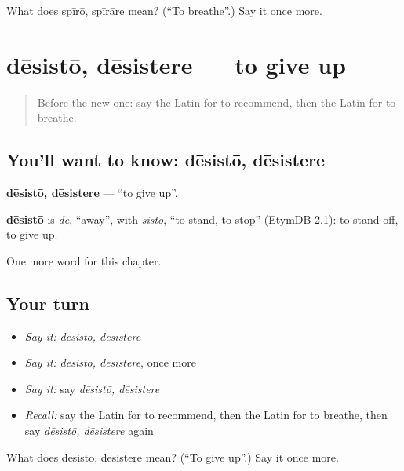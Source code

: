 \begin{tcolorbox}[breakable,colback=teal!4,colframe=teal!35!black,title={Before you move on}]
What does spīrō, spīrāre mean? (\textquotedblleft{}To breathe\textquotedblright{}.) Say it once more.
\end{tcolorbox}
\section[dēsistō, dēsistere]{dēsistō, dēsistere — to give up}

\label{lesson:LA-C259-desisto}



\begin{quote}
Before the new one: say the Latin for to recommend, then the Latin for to breathe.
\end{quote}

\subsection*{You'll want to know: dēsistō, dēsistere}
\textbf{dēsistō, dēsistere} — \textquotedblleft{}to give up\textquotedblright{}.

\begin{cousinweb}
\textbf{dēsistō} is \emph{dē}, \textquotedblleft{}away\textquotedblright{}, with \emph{sistō}, \textquotedblleft{}to stand, to stop\textquotedblright{} (EtymDB 2.1): to stand off, to give up.
\end{cousinweb}

\begin{grammarlens}[title={What you've built}]
One more word for this chapter.
\end{grammarlens}

\subsection*{Your turn}
\begin{itemize}
\raggedright
  \item \emph{Say it:} \emph{dēsistō, dēsistere}
  \item \emph{Say it:} \emph{dēsistō, dēsistere}, once more
  \item \emph{Say it:} say \emph{dēsistō, dēsistere}
  \item \emph{Recall:} say the Latin for to recommend, then the Latin for to breathe, then say \emph{dēsistō, dēsistere} again
\end{itemize}

\begin{tcolorbox}[breakable,colback=teal!4,colframe=teal!35!black,title={Before you move on}]
What does dēsistō, dēsistere mean? (\textquotedblleft{}To give up\textquotedblright{}.) Say it once more.
\end{tcolorbox}
